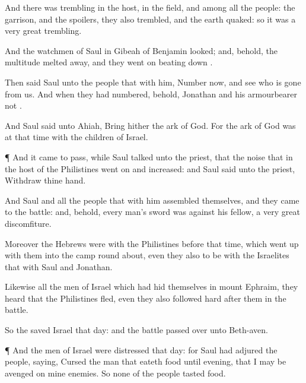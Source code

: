 {And there was
trembling in the
host, in the
field, and among all the
people: the
garrison, and the
spoilers, they also
trembled, and the
earth
quaked: so it was a very
great
trembling.


\par }{\PP {}And the
watchmen of
Saul in
Gibeah of
Benjamin
looked; and, behold, the
multitude melted
away, and they
went on beating
down
{}.

Then
said
Saul unto the
people that
{} with him,
Number now, and
see who is
gone from us. And when they had
numbered, behold,
Jonathan and his
armourbearer
{} not
{}.

And
Saul
said unto
Ahiah, Bring
hither the
ark of
God. For the
ark of
God was at that
time with the
children of
Israel.


\par }{\PP {}¶ And it came to pass, while
Saul
talked unto the
priest, that the
noise that
{} in the
host of the
Philistines
went
on and
increased: and
Saul
said unto the
priest,
Withdraw thine
hand.

And
Saul and all the
people that
{} with him
assembled themselves, and they
came to the
battle: and, behold, every
man’s
sword was against his
fellow,
{} a
very
great
discomfiture.

Moreover the
Hebrews
{} were with the
Philistines
before that
time, which went
up with them into the
camp
{} round
about, even they also
{} to be with the
Israelites that
{} with
Saul and
Jonathan.

Likewise all the
men of
Israel which had
hid themselves in
mount
Ephraim,
{} they
heard that the
Philistines
fled, even they also followed
hard
after them in the
battle.

So the
{}
saved
Israel that
day: and the
battle passed
over unto
Beth-aven.


\par }{\PP {}¶ And the
men of
Israel were
distressed that
day: for
Saul had
adjured the
people,
saying,
Cursed
{} the
man that
eateth
{}
food until
evening, that I may be
avenged on mine
enemies. So none of the
people
tasted
{}
food.

}
